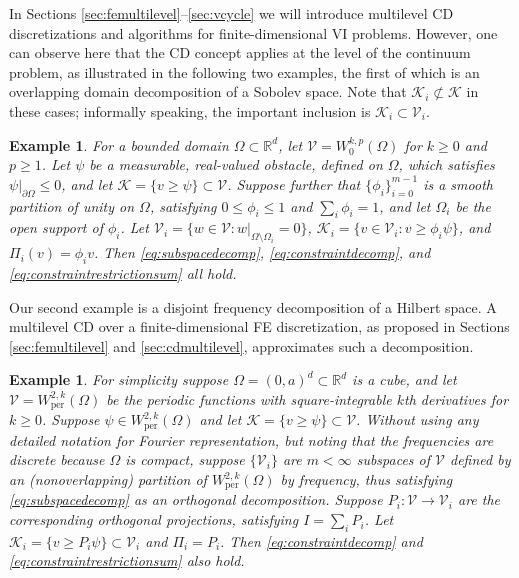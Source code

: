 \documentclass[letterpaper,final,12pt,reqno]{amsart}
\theoremstyle{cstyle}
\theoremstyle{cstyle*}
\theoremstyle{dstyle}
\newtheorem{example}[theorem]{Example}
\numberwithin{equation}{section}
\numberwithin{figure}{section}
\numberwithin{table}{section}
\numberwithin{theorem}{section}
\newcommand{\RR}{\mathbb{R}}
\newcommand{\cK}{\mathcal{K}}
\newcommand{\cV}{\mathcal{V}}
\begin{document}
In Sections \ref{sec:femultilevel}--\ref{sec:vcycle} we will introduce multilevel CD discretizations and algorithms for finite-dimensional VI problems.  However, one can observe here that the CD concept applies at the level of the continuum problem, as illustrated in the following two examples, the first of which is an overlapping domain decomposition of a Sobolev space.  Note that $\cK_i \not\subset \cK$ in these cases; informally speaking, the important inclusion is $\cK_i \subset \cV_i$.

\begin{example}  \label{ex:domaindecomposition}  For a bounded domain $\Omega \subset \RR^d$, let $\cV = W_0^{k,p}(\Omega)$ for $k\ge 0$ and $p\ge 1$.  Let $\psi$ be a measurable, real-valued obstacle, defined on $\Omega$, which satisfies $\psi|_{\partial \Omega} \le 0$, and let $\cK = \{v \ge \psi\} \subset \cV$.  Suppose further that $\{\phi_i\}_{i=0}^{m-1}$ is a smooth partition of unity on $\Omega$, satisfying $0 \le \phi_i\le 1$ and $\sum_i \phi_i = 1$, and let $\Omega_i$ be the open support of $\phi_i$.  Let $\cV_i = \{w \in \cV:w|_{\Omega \setminus \Omega_i} =0 \}$, $\cK_i = \{v \in \cV_i: v \ge \phi_i \psi\}$, and $\Pi_i(v) = \phi_i v$.  Then \eqref{eq:subspacedecomp}, \eqref{eq:constraintdecomp}, and \eqref{eq:constraintrestrictionsum} all hold.
\end{example}

Our second example is a disjoint frequency decomposition of a Hilbert space.  A multilevel CD over a finite-dimensional FE discretization, as proposed in Sections \ref{sec:femultilevel} and \ref{sec:cdmultilevel}, approximates such a decomposition.

\begin{example}  \label{ex:frequencydecomposition}  For simplicity suppose $\Omega = (0,a)^d \subset \RR^d$ is a cube, and let $\cV = W_{\text{per}}^{2,k}(\Omega)$ be the periodic functions with square-integrable $k$th derivatives for $k \ge 0$.  Suppose $\psi \in W_{\text{per}}^{2,k}(\Omega)$ and let $\cK = \{v \ge \psi\} \subset \cV$.  Without using any detailed notation for Fourier representation, but noting that the frequencies are discrete because $\Omega$ is compact, suppose $\{\cV_i\}$ are $m<\infty$ subspaces of $\cV$ defined by an (nonoverlapping) partition of $W_{\text{per}}^{2,k}(\Omega)$ by frequency, thus satisfying \eqref{eq:subspacedecomp} as an orthogonal decomposition.  Suppose $P_i:\cV \to \cV_i$ are the corresponding orthogonal projections, satisfying $I = \sum_i P_i$.  Let $\cK_i = \{v \ge P_i \psi\} \subset \cV_i$ and $\Pi_i = P_i$.  Then \eqref{eq:constraintdecomp} and \eqref{eq:constraintrestrictionsum} also hold.
\end{example}
\end{document}
